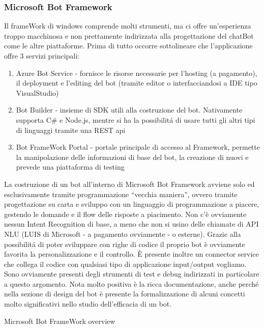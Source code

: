 \documentclass[]{article}
\begin{document}
\subsubsection{Microsoft Bot Framework}
Il frameWork di windows comprende molti strumenti, ma ci offre un’esperienza troppo macchinosa e non prettamente indirizzata alla progettazione del chatBot come le altre piattaforme. Prima di tutto occorre sottolineare che l’applicazione offre 3 servizi principali:
\begin{enumerate}
\item Azure Bot Service - fornisce le risorse necessarie per l’hosting (a pagamento), il deployment e l’editing del bot (tramite editor o interfacciandosi a IDE tipo VisualStudio)
\item Bot Builder - insieme di SDK utili alla costruzione del bot. Nativamente supporta C\# e Node.js, mentre si ha la possibilitá di usare tutti gli altri tipi di linguaggi tramite una REST api
\item Bot FrameWork Portal - portale principale di accesso al Framework, permette la manipolazione delle informazioni di base del bot, la creazione di nuovi e prevede una piattaforma di testing
\end{enumerate}
La costruzione di un bot all’interno di Microsoft Bot Framework avviene solo ed esclusivamente tramite programmazione “vecchia maniera”, ovvero tramite progettazione su carta e sviluppo con un linguaggio di programmazione a piacere, gestendo le domande e il flow delle risposte a piacimento. Non c’è ovviamente nessun Intent Recognition di base, a meno che non si usino delle chiamate di API  NLU (LUIS di Microsoft - a pagamento ovviamente - o esterne). Grazie alla possibilitá di poter sviluppare con righe di codice il proprio bot è ovviamente favorita la personalizzazione e il controllo. È presente inoltre un connector service che collega il codice con qualsiasi tipo di applicazione input/output vogliamo. Sono ovviamente presenti degli strumenti di test e debug indirizzati in particolare a questo argomento. Nota molto positiva è la ricca documentazione, anche perché nella sezione di design del bot è presente la formalizzazione di alcuni concetti molto significativi nello studio dell’efficacia di un bot.
\begin{center}
\footnotesize{Microsoft Bot FrameWork overview}
\end{center}
\end{document}
